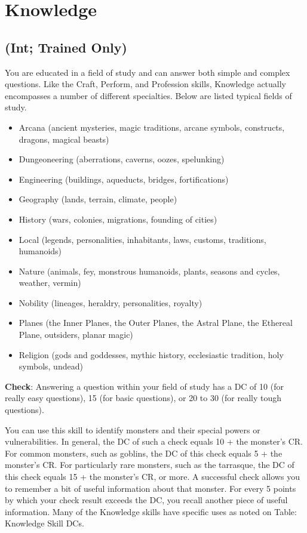 \section{Knowledge}

\label{f0}
\subsection{(Int; Trained Only)}

				
You are educated in a field of study and can answer both simple and complex questions. Like the Craft, Perform, and Profession skills, Knowledge actually encompasses a number of different specialties. Below are listed typical fields of study.
				\begin{itemize}\item  Arcana (ancient mysteries, magic traditions, arcane symbols, constructs, dragons, magical beasts)
				\item  Dungeoneering (aberrations, caverns, oozes, spelunking)
				\item  Engineering (buildings, aqueducts, bridges, fortifications)
				\item  Geography (lands, terrain, climate, people)
				\item  History (wars, colonies, migrations, founding of cities)
				\item  Local (legends, personalities, inhabitants, laws, customs, traditions, humanoids)
				\item  Nature (animals, fey, monstrous humanoids, plants, seasons and cycles, weather, vermin)
				\item  Nobility (lineages, heraldry, personalities, royalty)
				\item  Planes (the Inner Planes, the Outer Planes, the Astral Plane, the Ethereal Plane, outsiders, planar magic)
				\item  Religion (gods and goddesses, mythic history, ecclesiastic tradition, holy symbols, undead)
\end{itemize}
				
\textbf{Check}: Answering a question within your field of study has a DC of 10 (for really easy questions), 15 (for basic questions), or 20 to 30 (for really tough questions).
				
You can use this skill to identify monsters and their special powers or vulnerabilities. In general, the DC of such a check equals 10 + the monster's CR. For common monsters, such as goblins, the DC of this check equals 5 + the monster's CR. For particularly rare monsters, such as the tarrasque, the DC of this check equals 15 + the monster's CR, or more. A successful check allows you to remember a bit of useful information about that monster. For every 5 points by which your check result exceeds the DC, you recall another piece of useful information. Many of the Knowledge skills have specific uses as noted on Table: Knowledge Skill DCs.

